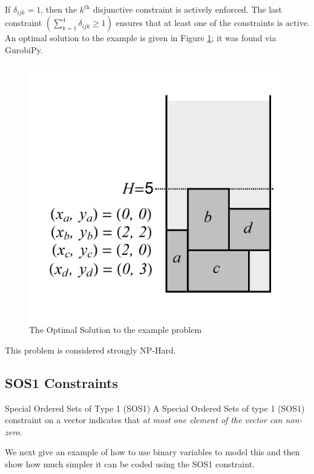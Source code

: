 If $\delta_{ijk} = 1$, then the $k^\text{th}$ disjunctive constraint is actively enforced. The last constraint $\left(\sum_{k=1}^4\delta_{ijk} \geq 1\right)$ ensures that at least one of the constraints is active. An optimal solution to the example is given in Figure \ref{fig:StripPacking-Opt}; it was found via GurobiPy.
	\begin{figure}[h!]
	\centering
	\includegraphics[height=.4\textheight]{Figures/StripPacking2}
	\caption{The Optimal Solution to the example problem}
	\label{fig:StripPacking-Opt}
	\end{figure}

This problem is considered strongly NP-Hard.






\subsection{SOS1 Constraints}
\begin{definition}{Special Ordered Sets of Type 1 (SOS1)}
A Special Ordered Sets of type 1 (SOS1) constraint on a vector indicates that \emph{at most one element of the vector can non-zero}.
\end{definition}
We next give an example of how to use binary variables to model this and then show how much simpler it can be coded using the SOS1 constraint.

